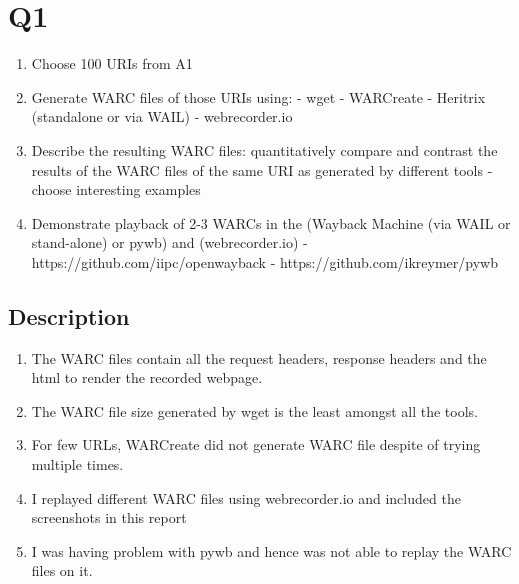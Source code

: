  


\section{Q1}
\label{part1}
\begin{enumerate}


\item Choose 100 URIs from A1

\item Generate WARC files of those URIs using:
- wget
- WARCreate
- Heritrix (standalone or via WAIL)
- webrecorder.io

\item Describe the resulting WARC files: quantitatively compare and contrast the results of the WARC files of the same URI as generated by different tools 
- choose interesting examples

 \item Demonstrate playback of 2-3 WARCs in the (Wayback Machine (via WAIL or stand-alone) or pywb) and (webrecorder.io)
- https://github.com/iipc/openwayback 
- https://github.com/ikreymer/pywb 


\end{enumerate}

\subsection{Description}


\begin{enumerate}

\item The WARC files contain all the request headers, response headers and the html to render the recorded webpage.

\item The WARC file size generated by wget is the least amongst all the tools.

\item For few URLs, WARCreate did not generate WARC file despite of trying multiple times.

\item I replayed different WARC files using webrecorder.io and included the screenshots in this report

\item I was having problem with pywb and hence was not able to replay the WARC files on it.


\end{enumerate}

\newpage


